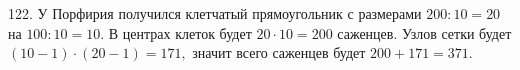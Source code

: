 122. У Порфирия получился клетчатый прямоугольник с размерами $200:10=20$ на $100:10=10.$ В центрах клеток будет $20\cdot10=200$ саженцев. Узлов сетки будет $(10-1)\cdot(20-1)=171,$ значит всего саженцев будет $200+171=371.$\\
